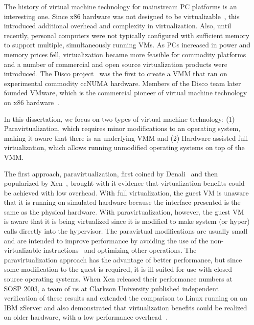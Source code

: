 The history of virtual machine technology for mainstream PC platforms is an interesting one. Since x86 hardware was not designed to be virtualizable~\cite{popek_1974}, this introduced additional overhead and complexity in virtualization. Also, until recently, personal computers were not typically configured with sufficient memory to support multiple, simultaneously running VMs.  As PCs increased in power and memory prices fell, virtualization became more feasible for commodity platforms and a number of commercial and open source virtualization products were introduced. The Disco project~\cite{bugnion_1997} was the first to create a VMM that ran on experimental commodity ccNUMA hardware. Members of the Disco team later founded VMware, which is the commercial pioneer of virtual machine technology on x86 hardware~\cite{vmware_website,adams_2006}.
 
In this dissertation, we focus on two types of virtual machine technology: (1) Paravirtualization, which requires minor modifications to an operating system, making it aware that there is an underlying VMM and (2) Hardware-assisted full virtualization, which allows running unmodified operating systems on top of the VMM.

The first approach, paravirtualization, first coined by Denali~\cite{whitaker_2002} and then popularized by Xen~\cite{barham_2003}, brought with it evidence that virtualization benefits could be achieved with low overhead. With full virtualization, the guest VM is unaware that it is running on simulated hardware because the interface presented is the same as the physical hardware. With paravirtualization, however, the guest VM is aware that it is being virtualized since it is modified to make system (or hyper) calls directly into the hypervisor. The paravirtual modifications are usually small and are intended to improve performance by avoiding the use of the non-virtualizable instructions~\cite{popek_1974} and optimizing other operations. The paravirtualization approach has the advantage of better performance, but since some modification to the guest is required, it is ill-suited for use with closed source operating systems. When Xen released their performance numbers at SOSP 2003, a team of us at Clarkson University published independent verification of these results and extended the comparison to Linux running on an IBM zServer and also demonstrated that virtualization benefits could be realized on older hardware, with a low performance overhead~\cite{clark_2004}.
 
